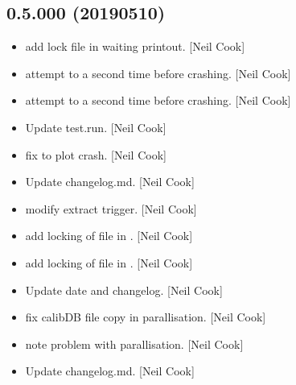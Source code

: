 \documentclass[a4paper,10pt,english]{report}
\begin{document}
\subsection{0.5.000 (2019\sphinxhyphen{}05\sphinxhyphen{}10)}
\label{\detokenize{misc/changelog:id156}}\begin{itemize}
\item {} 
 \sphinxhyphen{} add lock file in waiting printout. {[}Neil Cook{]}

\item {} 
 \sphinxhyphen{} attempt to  a second time before crashing.
{[}Neil Cook{]}

\item {} 
 \sphinxhyphen{} attempt to  a second time before crashing.
{[}Neil Cook{]}

\item {} 
Update test.run. {[}Neil Cook{]}

\item {} 
 \sphinxhyphen{} fix to plot crash. {[}Neil Cook{]}

\item {} 
Update changelog.md. {[}Neil Cook{]}

\item {} 
 \sphinxhyphen{} modify extract trigger. {[}Neil Cook{]}

\item {} 
 \sphinxhyphen{} add locking of file in . {[}Neil Cook{]}

\item {} 
 \sphinxhyphen{} add locking of file in . {[}Neil Cook{]}

\item {} 
Update date and changelog. {[}Neil Cook{]}

\item {} 
 \sphinxhyphen{} fix calibDB file copy in parallisation. {[}Neil Cook{]}

\item {} 
 \sphinxhyphen{} note problem with parallisation. {[}Neil Cook{]}

\item {} 
Update changelog.md. {[}Neil Cook{]}


\end{itemize}
\end{document}
